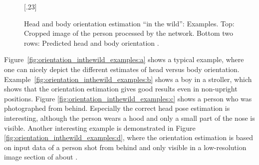 \documentclass[a4paper, 10pt, conference]{ieeeconf}
\begin{document}
\begin{figure}
{{   }
  \subcaptionbox{\label{fig:orientation_inthewild_examples:d}}[.23\columnwidth]{   }}
  \caption[Head and body orientation estimation \enquote{in the wild}: Examples]{Head and body orientation estimation \enquote{in the wild}: Examples. Top: Cropped image of the person processed by the network. Bottom two rows: Predicted head and body orientation .}
  \label{fig:orientation_inthewild_examples}
\end{figure}

Figure~\ref{fig:orientation_inthewild_examples:a} shows a typical example, where one can nicely depict the different estimates of head versus body orientation. Example~\ref{fig:orientation_inthewild_examples:b} shows a boy in a stroller, which shows that the orientation estimation gives good results even in non-upright positions. Figure \ref{fig:orientation_inthewild_examples:c} shows a person who was photographed from behind. Especially the correct head pose estimation is interesting, although the person wears a hood and only a small part of the nose is visible. Another interesting example is demonstrated in Figure \ref{fig:orientation_inthewild_examples:d}, where the orientation estimation is based on input data of a person shot from behind and only visible in a low-resolution image section of about . 
\end{document}
